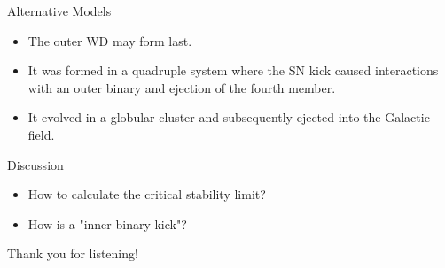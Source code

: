 \documentclass{beamer}
\begin{document}
\begin{frame}{Alternative Models}
    \begin{itemize}
        \item The outer WD may form last.
        
        \item It was formed in a quadruple system where the SN kick caused interactions with an outer binary and ejection of the fourth member.
        
        \item It evolved in a globular cluster and subsequently ejected into the Galactic field.
    \end{itemize}
\end{frame}

\begin{frame}{Discussion}
    \begin{itemize}
        \item[?] How to calculate the {\color{red}critical stability limit}?
        
        \item[?] How is a "inner binary kick"?
    \end{itemize}
\end{frame}

\begin{frame}[plain]
    \begin{center}
        \Huge Thank you for listening!
    \end{center}
\end{frame}
\end{document}

